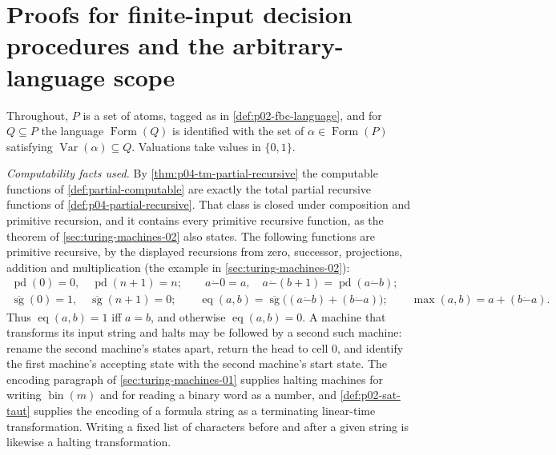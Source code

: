 \section{Proofs for finite-input decision procedures and the arbitrary-language scope}
\label{sec:annex-p02-w02-p02-017-finite-input-scope}

Throughout, \(P\) is a set of atoms, tagged as in
\cref{def:p02-fbc-language}, and for \(Q\subseteq P\) the language
\(\operatorname{Form}(Q)\) is identified with the set of
\(\alpha\in\operatorname{Form}(P)\) satisfying
\(\operatorname{Var}(\alpha)\subseteq Q\).  Valuations take values in
\(\{0,1\}\).

\emph{Computability facts used.}  By \cref{thm:p04-tm-partial-recursive}
the computable functions of \cref{def:partial-computable} are exactly
the total partial recursive functions of \cref{def:p04-partial-recursive}.
That class is closed under composition and primitive recursion, and it
contains every primitive recursive function, as
the theorem of \cref{sec:turing-machines-02} also states.  The following
functions are primitive recursive, by the displayed recursions from
zero, successor, projections, addition and multiplication
(the example in \cref{sec:turing-machines-02}):
\[
\begin{gathered}
 \operatorname{pd}(0)=0,\quad \operatorname{pd}(n+1)=n;\qquad
 a\mathbin{\dot{-}}0=a,\quad a\mathbin{\dot{-}}(b+1)=\operatorname{pd}(a\mathbin{\dot{-}} b);\\
 \overline{\operatorname{sg}}(0)=1,\quad
 \overline{\operatorname{sg}}(n+1)=0;\qquad
 \operatorname{eq}(a,b)=\overline{\operatorname{sg}}
   \bigl((a\mathbin{\dot{-}} b)+(b\mathbin{\dot{-}} a)\bigr);\qquad
 \max(a,b)=a+(b\mathbin{\dot{-}} a).
\end{gathered}
\]
Thus \(\operatorname{eq}(a,b)=1\) iff \(a=b\), and otherwise
\(\operatorname{eq}(a,b)=0\).  A machine that transforms its input string
and halts may be followed by a second such machine: rename the second
machine's states apart, return the head to cell \(0\), and identify the
first machine's accepting state with the second machine's start state.
The encoding paragraph of \cref{sec:turing-machines-01} supplies halting machines for writing
\(\operatorname{bin}(m)\) and for reading a binary word as a number, and
\cref{def:p02-sat-taut} supplies the encoding of a formula string as a
terminating linear-time transformation.  Writing a fixed list of
characters before and after a given string is likewise a halting
transformation.

